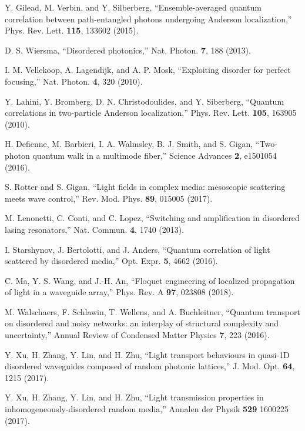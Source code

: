 \documentclass[9pt,twocolumn,twoside]{osajnl}
\begin{document}
\begin{thebibliography}{99}
 Y. Gilead, M. Verbin, and Y. Silberberg, \enquote{Ensemble-averaged quantum correlation between path-entangled photons undergoing Anderson localization,} Phys. Rev. Lett. \textbf{115}, 133602 (2015).

 D. S. Wiersma, \enquote{Disordered photonics,} Nat. Photon. \textbf{7}, 188 (2013).

 I. M. Vellekoop, A. Lagendijk, and A. P. Mosk, \enquote{Exploiting disorder for perfect focusing,} Nat. Photon. \textbf{4}, 320 (2010).

 Y. Lahini, Y. Bromberg, D. N. Christodoulides, and Y. Siberberg, \enquote{Quantum correlations in two-particle Anderson localization,} Phys. Rev. Lett. \textbf{105}, 163905 (2010).

 H. Defienne, M. Barbieri, I. A. Walmsley, B. J. Smith, and S. Gigan, \enquote{Two-photon quantum walk in a multimode fiber,} Science Advances \textbf{2}, e1501054 (2016).


 S. Rotter and S. Gigan, \enquote{Light fields in complex media: mesoscopic scattering meets wave control,} Rev. Mod. Phys. \textbf{89}, 015005 (2017).

 M. Lenonetti, C. Conti, and C. Lopez, \enquote{Switching and amplification in disordered lasing resonators,} Nat. Commun. \textbf{4}, 1740 (2013).

 I. Starshynov, J. Bertolotti, and J. Anders, \enquote{Quantum correlation of light scattered by disordered media,} Opt. Expr. \textbf{5}, 4662 (2016).

 C. Ma, Y. S. Wang, and J.-H. An, \enquote{Floquet engineering of localized propagation of light in a waveguide array,} Phys. Rev. A \textbf{97}, 023808 (2018).

 M. Walschaers, F. Schlawin, T. Wellens, and A. Buchleitner, \enquote{Quantum transport on disordered and noisy networks: an interplay of structural complexity and uncertainty,} Annual Review of Condensed Matter Physics \textbf{7}, 223 (2016).

 Y. Xu, H. Zhang, Y. Lin, and H. Zhu, \enquote{Light transport behaviours in quasi-1D disordered waveguides composed of random photonic lattices,} J. Mod. Opt. \textbf{64}, 1215 (2017).

 Y. Xu, H. Zhang, Y. Lin, and H. Zhu, \enquote{Light transmission properties in inhomogeneously-disordered random
media,} Annalen der Physik \textbf{529} 1600225 (2017).


\end{thebibliography}
\end{document}
